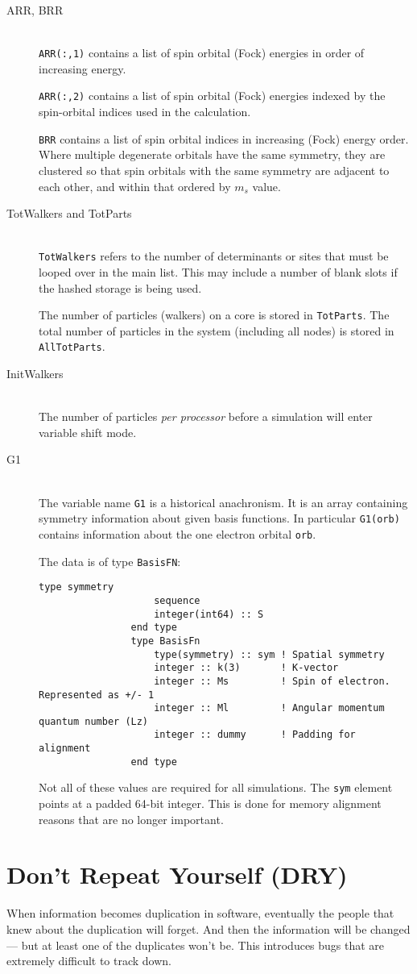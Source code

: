 \documentclass[a4paper,notitlepage]{scrreprt}
\newcommand\headitem[1]{\needspace{1.5\baselineskip}\item[{\boldmath #1 \nopagebreak}] \hfill \\ \nopagebreak}
\let\code\lstinline
\begin{document}
	\begin{description}
		\headitem{ARR, BRR}
			\code{ARR(:,1)} contains a list of spin orbital (Fock)
			energies in	order of increasing energy.

			\code{ARR(:,2)} contains a list of spin orbital (Fock)
			energies indexed by the spin-orbital indices used in the
			calculation.

			\code{BRR} contains a list of spin orbital indices in
			increasing (Fock) energy order. Where multiple degenerate orbitals
			have the same symmetry, they are clustered so that spin orbitals
			with the same symmetry are adjacent to each other, and within that
			ordered by $m_s$ value.

		\headitem{TotWalkers and TotParts}
			\code{TotWalkers} refers to the number of determinants or
			sites that must be looped over in the main list. This may include
			a number of blank slots if the hashed storage is being used.

			The number of particles (walkers) on a core is stored in
			\code{TotParts}. The total number of particles in the system
			(including all nodes) is stored in \code{AllTotParts}.

		\headitem{InitWalkers}
			The number of particles \emph{per processor} before a simulation
			will enter variable shift mode.

		\headitem{G1}
			The variable name \code{G1} is a historical anachronism. It
			is an array containing symmetry information about given basis
			functions. In particular \code{G1(orb)} contains information
			about the one electron orbital \code{orb}.

			The data is of type \code{BasisFN}:
			\begin{lstlisting}[gobble=12]
				type symmetry
					sequence
					integer(int64) :: S
				end type
				type BasisFn
					type(symmetry) :: sym ! Spatial symmetry
					integer :: k(3)       ! K-vector
					integer :: Ms         ! Spin of electron. Represented as +/- 1
					integer :: Ml         ! Angular momentum quantum number (Lz)
					integer :: dummy      ! Padding for alignment
				end type
			\end{lstlisting}
			Not all of these values are required for all simulations. The
			\code{sym} element points at a padded 64-bit integer. This
			is done for memory alignment reasons that are no longer important.
	\end{description}

\section{Don't Repeat Yourself (DRY)}
	When information becomes duplication in software, eventually the people
	that knew about the duplication will forget. And then the information will
	be changed --- but at least one of the duplicates won't be. This introduces
	bugs that are extremely difficult to track down.
\end{document}
